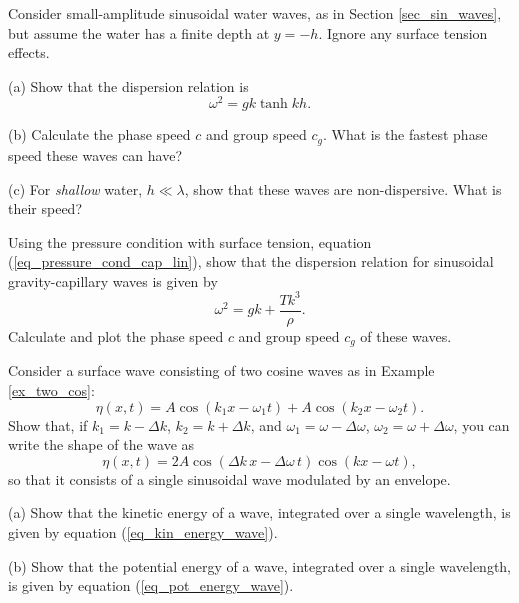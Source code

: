 \begin{problem}
\label{prob_finite_depth}
Consider small-amplitude sinusoidal water waves, as in Section \ref{sec_sin_waves}, but assume the water has a finite depth at $y = -h$.  Ignore any surface tension effects.

(a) Show that the dispersion relation is
\begin{equation}
\omega^2 = gk \tanh kh.
\end{equation}

(b) Calculate the phase speed $c$ and group speed $c_g$.  What is the fastest phase speed these waves can have?

(c) For \emph{shallow} water, $h \ll \lambda$, show that these waves are non-dispersive.  What is their speed?

\end{problem}

\begin{problem}
\label{prob_grav_cap_dispersion}
Using the pressure condition with surface tension, equation (\ref{eq_pressure_cond_cap_lin}), show that the dispersion relation for sinusoidal gravity-capillary waves is given by
\[
\omega^2 = gk + \frac{Tk^3}{\rho}.
\]
Calculate and plot the phase speed $c$ and group speed $c_g$ of these waves.
\end{problem}

\begin{problem}
\label{prob_two_cosines}
Consider a surface wave consisting of two cosine waves as in Example \ref{ex_two_cos}:
\[
\eta(x, t) = A \cos(k_1 x - \omega_1 t) + A \cos(k_2 x - \omega_2 t).
\]
Show that, if $k_1 = k - \Delta k$, $k_2 = k + \Delta k$, and $\omega_1 = \omega - \Delta \omega$, $\omega_2 = \omega + \Delta \omega$, you can write the shape of the wave as
\[
\eta(x, t) = 2A \cos(\Delta k \, x - \Delta \omega \, t) \cos(kx - \omega t),
\]
so that it consists of a single sinusoidal wave modulated by an envelope.
\end{problem}




\begin{problem}
\label{prob_energy}

(a) Show that the kinetic energy of a wave, integrated over a single wavelength, is given by equation (\ref{eq_kin_energy_wave}).

(b) Show that the potential energy of a wave, integrated over a single wavelength, is given by equation (\ref{eq_pot_energy_wave}).
\end{problem}



